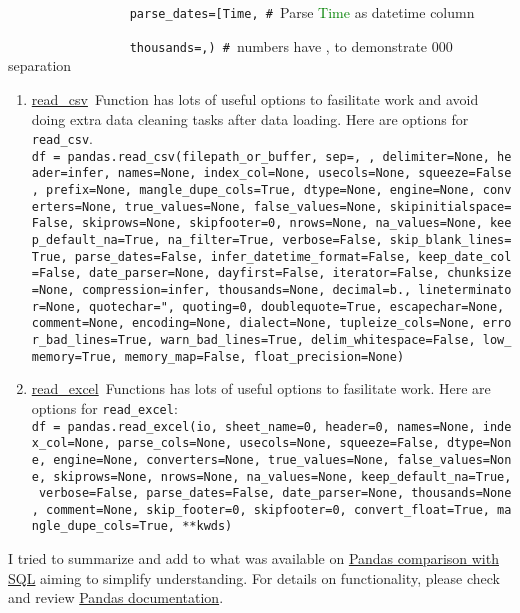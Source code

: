 \documentclass[11pt]{article}
\begin{document}
\texttt{~~~~~~~~~~~~~~~~~parse\_dates={[}\textquotesingle Time\textquotesingle{]},
\# }Parse \textcolor{green}{Time} as datetime column

\texttt{~~~~~~~~~~~~~~~~~thousands=\textquotesingle ,\textquotesingle )
\# }numbers have , to demonstrate 000 separation\texttt{}~\\

\begin{enumerate}
\item \href{https://pandas.pydata.org/pandas-docs/stable/reference/api/pandas.read_csv.html}{read\_csv}~Function
has lots of useful options to fasilitate work and avoid doing extra
data cleaning tasks after data loading. Here are options for \texttt{read\_csv}.\texttt{ }~\\
\texttt{df\ =\ pandas.read\_csv(filepath\_or\_buffer,\ sep=\textquotesingle ,\ \textquotesingle ,\ delimiter=None,\ header=\textquotesingle infer\textquotesingle ,\ names=None,\ index\_col=None,\ usecols=None,\ squeeze=False,\ prefix=None,\ mangle\_dupe\_cols=True,\ dtype=None,\ engine=None,\ converters=None,\ true\_values=None,\ false\_values=None,\ skipinitialspace=False,\ skiprows=None,\ skipfooter=0,\ nrows=None,\ na\_values=None,\ keep\_default\_na=True,\ na\_filter=True,\ verbose=False,\ skip\_blank\_lines=True,\ parse\_dates=False,\ infer\_datetime\_format=False,\ keep\_date\_col=False,\ date\_parser=None,\ dayfirst=False,\ iterator=False,\ chunksize=None,\ compression=\textquotesingle infer\textquotesingle ,\ thousands=None,\ decimal=b\textquotesingle .\textquotesingle ,\ lineterminator=None,\ quotechar=\textquotesingle "\textquotesingle ,\ quoting=0,\ doublequote=True,\ escapechar=None,\ comment=None,\ encoding=None,\ dialect=None,\ tupleize\_cols=None,\ error\_bad\_lines=True,\ warn\_bad\_lines=True,\ delim\_whitespace=False,\ low\_memory=True,\ memory\_map=False,\ float\_precision=None)} 
\item \href{https://pandas.pydata.org/pandas-docs/stable/reference/api/pandas.read_excel.html\%5C\#pandas.read_excel}{read\_excel}~Functions
has lots of useful options to fasilitate work. Here are options for
\texttt{read\_excel}:\\
 \texttt{df\ =\ pandas.read\_excel(io,\ sheet\_name=0,\ header=0,\ names=None,\ index\_col=None,\ parse\_cols=None,\ usecols=None,\ squeeze=False,\ dtype=None,\ engine=None,\ converters=None,\ true\_values=None,\ false\_values=None,\ skiprows=None,\ nrows=None,\ na\_values=None,\ keep\_default\_na=True,\ verbose=False,\ parse\_dates=False,\ date\_parser=None,\ thousands=None,\ comment=None,\ skip\_footer=0,\ skipfooter=0,\ convert\_float=True,\ mangle\_dupe\_cols=True,\ {*}{*}kwds)} 
\end{enumerate}
I tried to summarize and add to what was available on \href{https://pandas.pydata.org/pandas-docs/stable/getting_started/comparison/comparison_with_sql.html}{Pandas comparison with SQL}
aiming to simplify understanding. For details on functionality, please
check and review \href{http://pandas.pydata.org/pandas-docs/stable}{Pandas documentation}.
\end{document}
